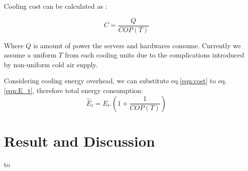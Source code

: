 \documentclass[conference]{IEEEtran}
\begin{document}
Cooling cost can be calculated as  \cite{moore2005making} :

\begin{equation}\label{eqn:cost}
C = \frac{Q}{COP(T)}
\end{equation}

Where $Q$ is amount of power the servers and hardwares consume.
Currently we assume a uniform $T$ from each cooling units due to the complications introduced by non-uniform cold air supply.

Considering cooling energy overhead, we can substitute eq.\ref{eqn:cost} to eq.\ref{eqn:E_t}, therefore total energy consumption: 
\begin{equation}
	\hat{E}_{t} = E_{t}.\left( 1+\frac{1}{COP(T)} \right)
\end{equation}


\section{Result and Discussion}\label{analysis}

\begin{table}[htp!]
\caption{Numerical Simulation Parameters from \cite{Nedevschi:2008:HDC:1855610.1855618}, \cite{valancius2009greening},\cite{4509688}, and \cite{Sun:2009:POS:1542245.1542249}.}
\label{tab:simparameters}
\hbox to
\end{table}
\end{document}
